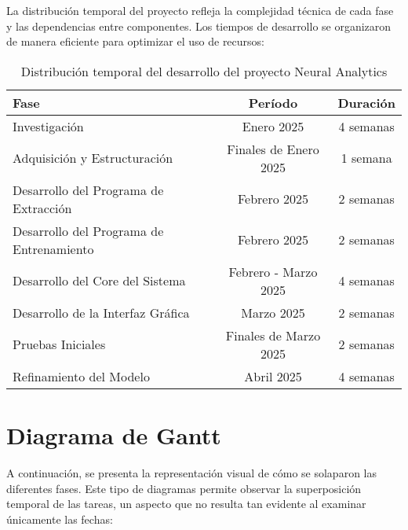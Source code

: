 La distribución temporal del proyecto refleja la complejidad técnica de cada fase y las dependencias entre componentes. Los tiempos de desarrollo se organizaron de manera eficiente para optimizar el uso de recursos:

\begin{table}[ht]
    \centering
    \begin{tabular}{|l|c|c|}
        \hline
        \textbf{Fase} & \textbf{Período} & \textbf{Duración} \\
        \hline
        Investigación & Enero 2025 & 4 semanas \\
        \hline
        Adquisición y Estructuración & Finales de Enero 2025 & 1 semana \\
        \hline
        Desarrollo del Programa de Extracción & Febrero 2025 & 2 semanas \\
        \hline
        Desarrollo del Programa de Entrenamiento & Febrero 2025 & 2 semanas \\
        \hline
        Desarrollo del Core del Sistema & Febrero - Marzo 2025 & 4 semanas \\
        \hline
        Desarrollo de la Interfaz Gráfica & Marzo 2025 & 2 semanas \\
        \hline
        Pruebas Iniciales & Finales de Marzo 2025 & 2 semanas \\
        \hline
        Refinamiento del Modelo & Abril 2025 & 4 semanas \\
        \hline
    \end{tabular}
    \caption{Distribución temporal del desarrollo del proyecto Neural Analytics}
    \label{tab:temporal_distribution}
\end{table}

\newpage
\section{Diagrama de Gantt}

A continuación, se presenta la representación visual de cómo se solaparon las diferentes fases. Este tipo de diagramas permite observar la superposición temporal de las tareas, un aspecto que no resulta tan evidente al examinar únicamente las fechas:

